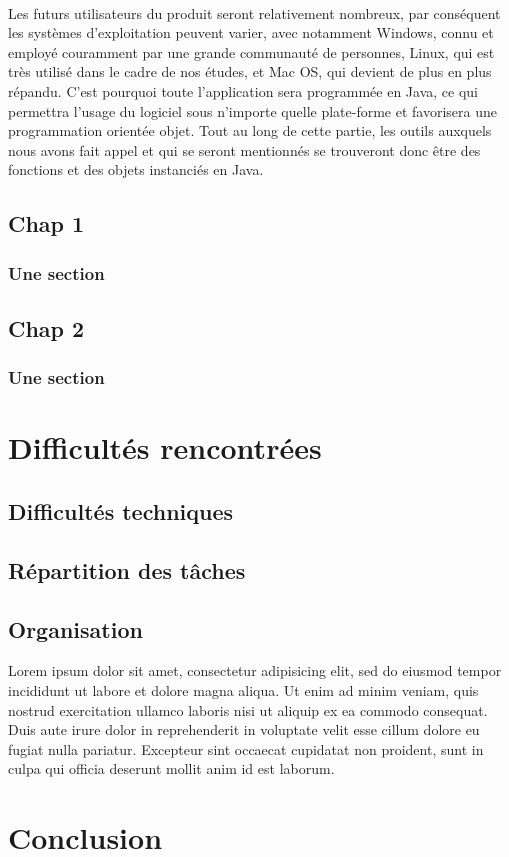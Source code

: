 \documentclass[a4paper,10pt]{report}
\begin{document}
  \paragraph{}
    Les futurs utilisateurs du produit seront relativement nombreux, par conséquent les systèmes d'exploitation peuvent varier, avec notamment Windows, connu et employé couramment par une grande communauté de personnes, Linux, qui est très utilisé dans le cadre de nos études, et Mac OS, qui devient de plus en plus répandu.
    C'est pourquoi toute l'application sera programmée en Java, ce qui permettra l'usage du logiciel sous n'importe quelle plate-forme et favorisera une programmation orientée objet.
    Tout au long de cette partie, les outils auxquels nous avons fait appel et qui se seront mentionnés se trouveront donc être des fonctions et des objets instanciés en Java.
  
  
  
  \chapter{Chap 1}
    \section{Une section}
  \chapter{Chap 2}
    \section{Une section}
\part{Difficultés rencontrées}
  \chapter{Difficultés techniques}
  \chapter{Répartition des tâches}
  \chapter{Organisation}
Lorem ipsum dolor sit amet, consectetur adipisicing elit, sed do eiusmod tempor incididunt ut labore et dolore magna aliqua. Ut enim ad minim veniam, quis nostrud exercitation ullamco laboris nisi ut aliquip ex ea commodo consequat. Duis aute irure dolor in reprehenderit in voluptate velit esse cillum dolore eu fugiat nulla pariatur. Excepteur sint occaecat cupidatat non proident, sunt in culpa qui officia deserunt mollit anim id est laborum.

\part{Conclusion}
\end{document}
